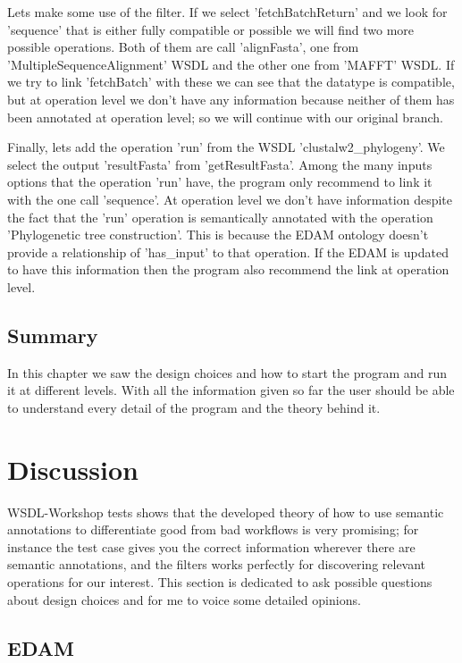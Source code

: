 \documentclass[a4paper,10pt]{article}
\begin{document}
  Lets make some use of the filter. If we select 'fetchBatchReturn' and we look for 'sequence' that is either fully compatible or possible we will find two more possible operations. Both of them are call 'alignFasta', one from 'MultipleSequenceAlignment' WSDL and the other one from 'MAFFT' WSDL. If we try to link 'fetchBatch' with these we can see that the datatype is compatible, but at operation level we don't have any information because neither of them has been annotated at operation level; so we will continue with our original branch.\vspace{3 mm}

  Finally, lets add the operation 'run' from the WSDL 'clustalw2\_phylogeny'. We select the output 'resultFasta' from 'getResultFasta'. Among the many inputs options that the operation 'run' have, the program only recommend to link it with the one call 'sequence'. At operation level we don't have information despite the fact that the 'run' operation is semantically annotated with the operation 'Phylogenetic tree construction'. This is because the EDAM ontology doesn't provide a relationship of 'has\_input' to that operation. If the EDAM is updated to have this information then the program also recommend the link at operation level.



  \subsection{Summary}
  In this chapter we saw the design choices and how to start the program and run it at different levels. With all the information given so far the user should be able to understand every detail of the program and the theory behind it.


\newpage

\section{Discussion}

  WSDL-Workshop tests shows that the developed theory of how to use semantic annotations to differentiate good from bad workflows is very promising; for instance the test case gives you the correct information wherever there are semantic annotations, and the filters works perfectly for discovering relevant operations for our interest. This section is dedicated to ask possible questions about design choices and for me to voice some detailed opinions.

  \subsection{EDAM}
  \label{sec:edamDiscussion}
\end{document}
